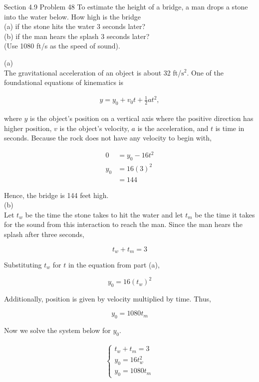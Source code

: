 \documentclass{article}
\begin{document}
    \begin{tbhtheorem}{Section 4.9 Problem 48}
        To estimate the height of a bridge, a man drops a stone into the water below. How high is the bridge \\
        (a) if the stone hits the water 3 seconds later? \\
        (b) if the man hears the splash 3 seconds later? \\
        (Use 1080 ft/s as the speed of sound).
    \end{tbhtheorem}

    (a) \\
    The gravitational acceleration of an object is about 32 ft/$\text{s}^2$. One of the foundational equations of kinematics is

    \begin{align*}
        y = y_0 + v_0 t + \frac{1}{2}at^2,
    \end{align*}

    where $y$ is the object's position on a vertical axis where the positive direction has higher position, $v$ is the object's velocity, $a$ is the acceleration, and $t$ is time in seconds.
    Because the rock does not have any velocity to begin with,

    \begin{align*}
        0   &= y_0 - 16t^2 \\
        y_0 &= 16(3)^2 \\
            &= 144
    \end{align*}

    Hence, the bridge is 144 feet high. \\

    (b) \\
    Let $t_w$ be the time the stone takes to hit the water and let $t_m$ be the time it takes for the sound from this interaction to reach the man. Since the man hears the splash after three seconds,

    \[
        t_w + t_m = 3
    \]

    Substituting $t_w$ for $t$ in the equation from part (a),

    \[
        y_0 = 16(t_w)^2
    \]

    Additionally, position is given by velocity multiplied by time. Thus,

    \[
        y_0 = 1080t_m
    \]

    Now we solve the system below for $y_0$.

    \begin{align*}
        \begin{cases}
            t_w + t_m = 3 \\
            y_0 = 16 t_w^2 \\
            y_0 = 1080t_m
        \end{cases}
    \end{align*}
\end{document}
